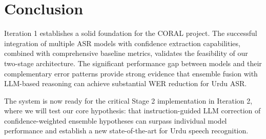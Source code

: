 \chapter{Conclusion}
\label{sec:conclusion}
Iteration 1 establishes a solid foundation for the CORAL project. The successful integration of multiple ASR models with confidence extraction capabilities, combined with comprehensive baseline metrics, validates the feasibility of our two-stage architecture. The significant performance gap between models and their complementary error patterns provide strong evidence that ensemble fusion with LLM-based reasoning can achieve substantial WER reduction for Urdu ASR.

The system is now ready for the critical Stage 2 implementation in Iteration 2, where we will test our core hypothesis: that instruction-guided LLM correction of confidence-weighted ensemble hypotheses can surpass individual model performance and establish a new state-of-the-art for Urdu speech recognition.